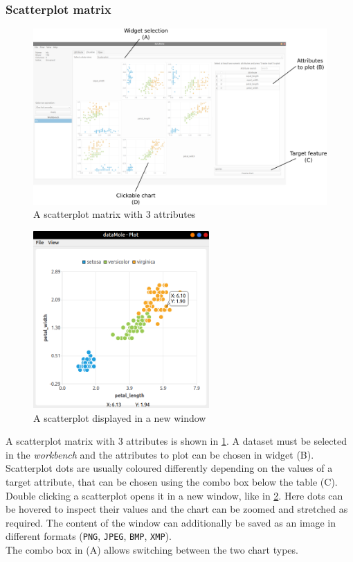 \subsubsection{Scatterplot matrix}
\begin{figure}
	\centering
	\includegraphics[width=\textwidth]{scatterplot-matrix}
	\caption{A scatterplot matrix with 3 attributes}
	\label{fig:scatterplot-matrix}
\end{figure}
\begin{figure}
	\centering
	\includegraphics[width=0.6\textwidth]{scatterplot}
	\caption{A scatterplot displayed in a new window}
	\label{fig:scatterplot-single}
\end{figure}
A scatterplot matrix with 3 attributes is shown in \cref{fig:scatterplot-matrix}. A dataset must be selected in the \textit{workbench} and the attributes to plot can be chosen in widget (B). Scatterplot dots are usually coloured differently depending on the values of a target attribute, that can be chosen using the combo box below the table (C).\\
Double clicking a scatterplot opens it in a new window, like in \cref{fig:scatterplot-single}. Here dots can be hovered to inspect their values and the chart can be zoomed and stretched as required. The content of the window can additionally be saved as an image in different formats (\texttt{PNG}, \texttt{JPEG}, \texttt{BMP}, \texttt{XMP}).\\
The combo box in (A) allows switching between the two chart types.

